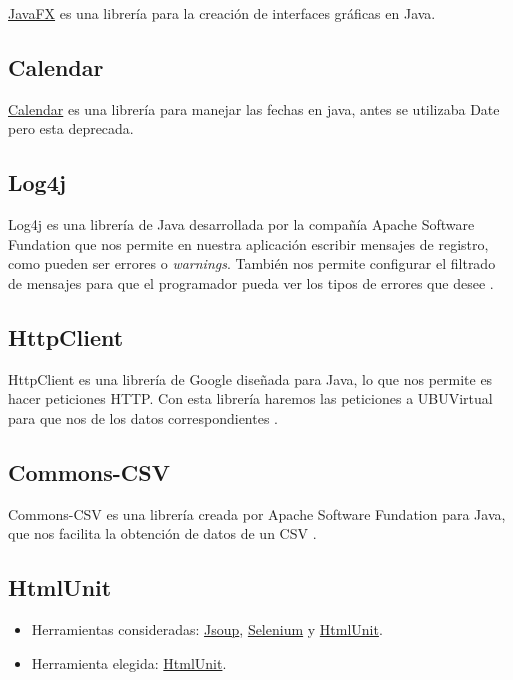 \href{http://docs.oracle.com/javase/8/javase-clienttechnologies.htm}{JavaFX}
es una librería para la creación de interfaces gráficas en Java.

\subsection{Calendar}\label{calendar}

\href{https://docs.oracle.com/javase/8/docs/api/java/util/Calendar.html}{Calendar}
es una librería para manejar las fechas en java, antes se utilizaba Date pero esta deprecada.

\subsection{Log4j}\label{log4j}

Log4j es una librería de Java desarrollada por la compañía Apache Software Fundation que nos permite en nuestra aplicación escribir mensajes de registro, como pueden ser errores o \emph{warnings}. También nos permite configurar el filtrado de mensajes para que el programador pueda ver los tipos de errores que desee \cite{Java:log}.

\subsection{HttpClient}\label{httpclient}

HttpClient es una librería de Google diseñada para Java, lo que nos permite es hacer peticiones HTTP. Con esta librería haremos las peticiones a UBUVirtual para que nos de los datos correspondientes \cite{java:Httpclient}.
\subsection{Commons-CSV}\label{commons-csv}

Commons-CSV es una librería creada por Apache Software Fundation para Java, que nos facilita la obtención de datos de un CSV \cite{java:csvparser}.

\subsection{HtmlUnit}\label{htmlunit}
\begin{itemize}
	\tightlist
	\item
	Herramientas consideradas: \href{https://jsoup.org/}{Jsoup},
	\href{http://www.seleniumhq.org/}{Selenium} y
	\href{http://htmlunit.sourceforge.net/}{HtmlUnit}.
	\item
	Herramienta elegida: \href{http://htmlunit.sourceforge.net/}{HtmlUnit}.
\end{itemize}

